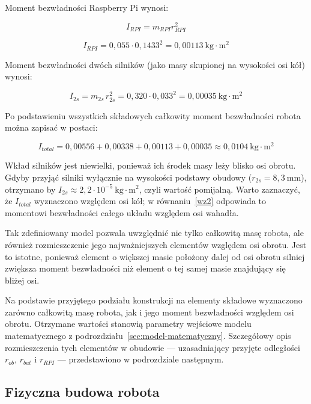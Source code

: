 \documentclass[12pt,twoside]{article}
\begin{document}
Moment bezwładności Raspberry Pi wynosi:

\begin{equation}
I_{RPI}=m_{RPI}r_{RPI}^2
\end{equation}

\begin{equation}
I_{RPI}=0{,}055 \cdot 0{,}1433^2 = 0{,}00113\ \mathrm{kg{\cdot}m^2}
\end{equation}

Moment bezwładności dwóch silników (jako masy skupionej na wysokości osi kół) wynosi:

\begin{equation}
I_{2s}=m_{2s}\,r_{2s}^2 = 0{,}320 \cdot 0{,}033^2 = 0{,}00035\ \mathrm{kg{\cdot}m^2}
\end{equation}

Po podstawieniu wszystkich składowych całkowity moment bezwładności robota
można zapisać w postaci:

\begin{equation}
I_{total}=0{,}00556+0{,}00338+0{,}00113+0{,}00035 \approx 0{,}0104\ \mathrm{kg{\cdot}m^2}
\end{equation}

Wkład silników jest niewielki, ponieważ ich środek masy leży blisko osi obrotu.
Gdyby przyjąć silniki wyłącznie na wysokości podstawy obudowy ($r_{2s}=8{,}3\ \mathrm{mm}$),
otrzymano by $I_{2s} \approx 2{,}2 \cdot 10^{-5}\ \mathrm{kg{\cdot}m^2}$, czyli wartość pomijalną.
Warto zaznaczyć, że $I_{total}$ wyznaczono względem osi kół; w równaniu~\eqref{wz2}
odpowiada to momentowi bezwładności całego układu względem osi wahadła.


Tak zdefiniowany model pozwala uwzględnić nie tylko całkowitą masę robota, ale
również rozmieszczenie jego najważniejszych elementów względem osi obrotu.
Jest to istotne, ponieważ element o większej masie położony dalej od osi
obrotu silniej zwiększa moment bezwładności niż element o tej samej masie
znajdujący się bliżej osi.

Na podstawie przyjętego podziału konstrukcji na elementy składowe wyznaczono zarówno całkowitą masę robota, jak i jego moment bezwładności względem osi obrotu. Otrzymane wartości stanowią parametry wejściowe modelu matematycznego z podrozdziału~\ref{sec:model-matematyczny}. Szczegółowy opis rozmieszczenia tych elementów w obudowie --- uzasadniający przyjęte odległości $r_{ob}$, $r_{bat}$ i $r_{RPI}$ --- przedstawiono w podrozdziale następnym.

\subsection{Fizyczna budowa robota}
\end{document}
